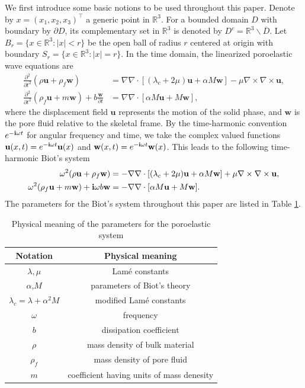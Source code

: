 \documentclass[11pt]{article}
\newcommand{\mat}{\mathbb}
\newcommand{\R}{{\mat R}}
\newcommand{\ba}{\backslash}
\newcommand{\pa}{\partial}
\newcommand{\ov}{\overline}
\newcommand{\la}{\lambda}
\begin{document}
We first introduce some basic notions to be used throughout this paper. Denote by $x=(x_1,x_2,x_3)^{\top}$ 
a generic point in $\R^3$. For a bounded domain $D$ with boundary by $\pa D$, its complementary set in $ \R^3$ 
is denoted by $D^c= \R^3\ba\ov{D}$. Let $B_r=\{x\in \R^3:|x|<r\}$ be the open ball of radius $r$ centered 
at origin with boundary $S_r=\{x\in \R^3:|x|=r\}$. In the time domain, the linearized poroelastic wave 
equations are \cite{Philippacopoulos1998Spectral}
\begin{align*}
\frac{\pa^2}{\pa t^2}(\rho\mathbf{u} +\rho_f \mathbf{w})&=\nabla \nabla \cdot [(\la_c+2\mu)\mathbf{u}
+\alpha M \mathbf{w}]-\mu \nabla \times \nabla \times \mathbf{u},\\
\frac{\pa^2}{\pa t^2}(\rho_f \mathbf{u}+m \mathbf{w})+ b \frac{\mathbf{w}}{\pa t}&=\nabla \nabla \cdot 
[\alpha M \mathbf{u}+ M \mathbf{w}],
\end{align*}
where the displacement field $\mathbf{u}$ represents the motion of the solid phase, and $\mathbf{w}$ 
is the pore fluid relative to the skeletal frame. By the time-harmonic convention $e^{-{\bf{i}}\omega t}$
for angular frequency and time, we take the complex valued functions $\mathbf{u}(x,t)=e^{-{\bf{i}}\omega t}
\mathbf{u}(x)$ and $\mathbf{w}(x,t)=e^{-{\bf{i}}\omega t}\mathbf{w}(x)$. This leads to the following 
time-harmonic Biot's system 
\begin{align}\label{poroelastic1}
\omega^2(\rho\mathbf{u} +\rho_f \mathbf{w}) &= -\nabla \nabla \cdot [(\la_c+2\mu)\mathbf{u}
+\alpha M \mathbf{w}]+\mu\nabla \times \nabla \times \mathbf{u},  \\ \label{poroelastic2}
\omega^2(\rho_f \mathbf{u}+m \mathbf{w})+{\bf{i}}\omega b \mathbf{w} &= -\nabla \nabla \cdot 
[\alpha M \mathbf{u}+ M \mathbf{w}].
\end{align}
The parameters for the Biot's system throughout this paper are listed in Table \ref{para_meaning}.
\begin{table}[htbp]
\centering
\caption{Physical meaning of the parameters for the poroelastic system}
\vspace{5pt}
\begin{tabular}{|c|c|} \hline
Notation & Physical meaning\\ \hline
$\la,\mu$ & Lam\'{e} constants \\ \hline
$\alpha$,$M$ & parameters of Biot's theory \\ \hline
$\la_c=\la+\alpha^2 M$ & modified Lam\'{e} constants \\ \hline
$\omega$ & frequency \\ \hline
$b$ &  dissipation coefficient \\ \hline
$\rho$ & mass density of bulk material \\ \hline
$\rho_f$ & mass density of pore fluid \\ \hline
$m$ & coefficient having units of mass denesity \\ \hline
\end{tabular}
\label{para_meaning}
\end{table}
\end{document}
